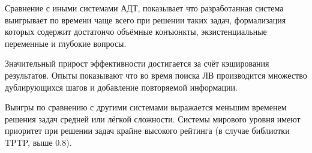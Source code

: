 Сравнение с иными системами АДТ, показывает что разработанная система выигрывает по времени чаще всего при решении таких задач, формализация которых содержит достатончо объёмные конъюнкты, экзистенциальные переменные и глубокие вопросы. 

Значительный прирост эффективности достигается за счёт кэширования результатов. Опыты показывают что во время поиска ЛВ производится множество дублирующихся шагов и добавление повторяемой информации.

Выигры по сравнению с другими системами выражается меньшим временем решения задач средней или лёгкой сложности. Системы мирового уровня имеют приоритет при решении задач крайне высокого рейтинга (в случае библиотки TPTP, выше 0.8).  



